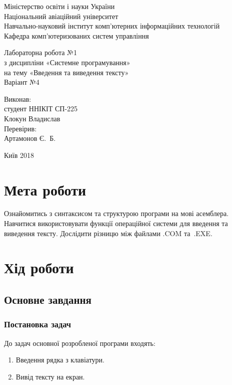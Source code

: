 \documentclass[a4paper,oneside,DIV=12,12pt]{scrartcl}
\begin{document}
	\begin{titlepage}
	\centering
		Міністерство освіти і науки України\\
		Національний авіаційний університет\\
		Навчально-науковий інститут комп'ютерних інформаційних технологій\\
		Кафедра комп'ютеризованих систем управління

		\vspace{\fill}

		Лабораторна робота №1\\
		з дисципліни «Системне програмування»\\
		на тему «Введення та виведення тексту»\\
		Варіант №4

		\vspace{\fill}
		
		\begin{flushright}
			Виконав:\\
			студент ННІКІТ СП-225\\
			Клокун Владислав\\
			Перевірив:\\
			Артамонов Є.~Б.
		\end{flushright}

		Київ 2018
    \end{titlepage}
	
	\section{Мета роботи}
		Ознайомитись з синтаксисом та структурою програми на мові асемблера. Навчитися використовувати функції операційної системи для введення та виведення тексту. Дослідити різницю між файлами .COM та~.EXE.
		
	\section{Хід роботи}
		\subsection{Основне завдання}
			\subsubsection{Постановка задач}
				До задач основної розробленої програми входять:
				\begin{enumerate}
					\item Введення рядка з клавіатури.
					\item Вивід тексту на екран.
				\end{enumerate}
			
\end{document}
